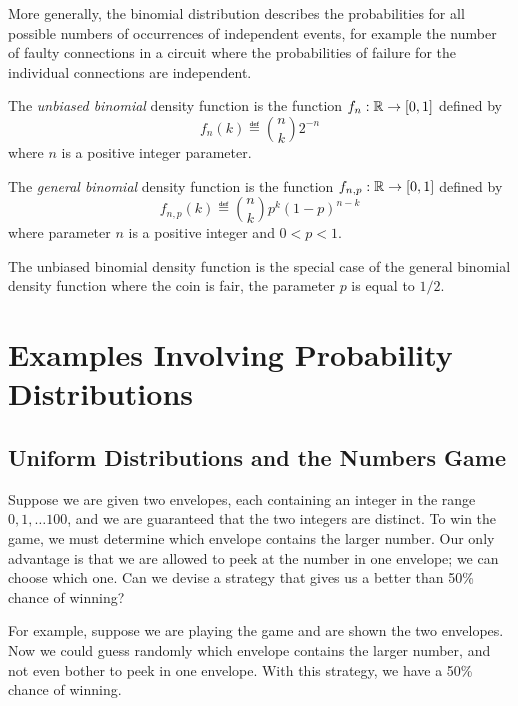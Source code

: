 \documentclass[11pt,twoside]{article}
\begin{document}
More generally, the binomial distribution describes the probabilities for
all possible numbers of occurrences of independent events, for example the
number of faulty connections in a circuit where the probabilities of
failure for the individual connections are independent.

\begin{definition}
The \emph{unbiased binomial} density function is the function $f_n: \mathbb{R}
\to [0,1]$ defined by
\[
f_n(k) \eqdef \binom{n}{k} 2^{-n}
\]
where $n$ is a positive integer parameter.

The \emph{general binomial} density function is the function $f_{n,p}:
\mathbb{R} \to [0,1]$ defined by
\[
f_{n,p}(k) \eqdef \binom{n}{k} p^k (1-p)^{n-k}
\]
where parameter $n$ is a positive integer and $0 < p < 1$.
\end{definition}

The unbiased binomial density function is the special case of the general
binomial density function where the coin is fair, \viz the parameter $p$
is equal to $1/2$.

\section{Examples Involving Probability Distributions}

\subsection{Uniform Distributions and the Numbers Game}


Suppose we are given two envelopes, each containing an integer in the
range $0, 1, \ldots 100$, and we are guaranteed that the two integers are
distinct.  To win the game, we must determine which envelope contains the
larger number.  Our only advantage is that we are allowed to peek at the
number in one envelope; we can choose which one.  Can we devise a strategy
that gives us a better than 50\% chance of winning?

For example, suppose we are playing the game and are shown the two
envelopes.  Now we could guess randomly which envelope contains the
larger number, and not even bother to peek in one envelope.  With this
strategy, we have a 50\% chance of winning.
\end{document}
